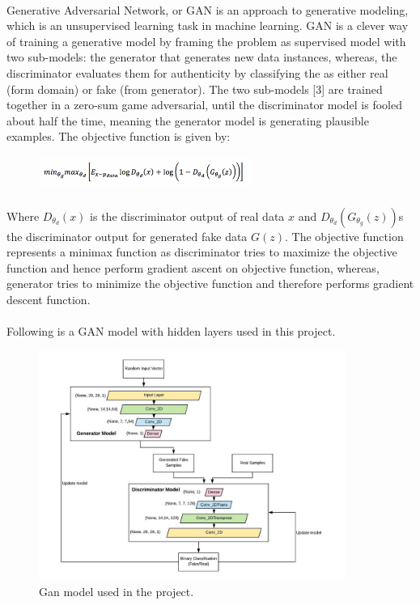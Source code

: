 \documentclass{article}
\begin{document}
\paragraph{}
Generative Adversarial Network, or GAN is an approach to generative modeling, which is an unsupervised learning task in machine learning. GAN is a clever way of training a generative model by framing the problem as supervised model with two sub-models: the generator that generates new data instances, whereas, the discriminator evaluates them for authenticity by classifying the as either real (form domain) or fake (from generator). The two sub-models [3] are trained together in a zero-sum game adversarial, until the discriminator model is fooled about half the time, meaning the generator model is generating plausible examples. The objective function is given by:
\begin{figure}[ht]
	\centering
	\includegraphics[width=7cm]{figs/eq1}
\end{figure}

\paragraph{}
Where \( D_{\theta_d}(x)\)  is the discriminator output of real data \(x\) and \(D_{\theta_d} (G_{\theta_g}(z))  \)s the discriminator output for generated fake data \(G(z)\). The objective function represents a minimax function as discriminator tries to maximize the objective function and hence perform gradient ascent on objective function, whereas, generator tries to minimize the objective function and therefore performs gradient descent function. 

\paragraph{}
Following is a GAN model with hidden layers used in this project.

\begin{figure}[H]
	\centering
	\includegraphics[width=10cm]{figs/Picture2}
	\caption{Gan model used in the project.}
\end{figure}
\end{document}
